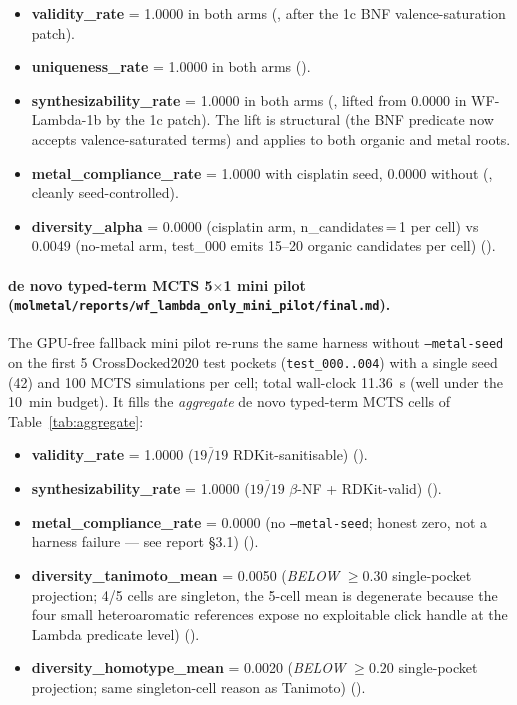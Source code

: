 \begin{itemize}
  \item \textbf{validity\_rate} = 1.0000 in both arms (\MEASURED{},
        after the 1c BNF valence-saturation patch).
  \item \textbf{uniqueness\_rate} = 1.0000 in both arms
        (\MEASURED{}).
  \item \textbf{synthesizability\_rate} = 1.0000 in both arms
        (\MEASURED{}, lifted from 0.0000 in WF-Lambda-1b by the 1c
        patch). The lift is structural (the BNF predicate now
        accepts valence-saturated terms) and applies to both organic
        and metal roots.
  \item \textbf{metal\_compliance\_rate} = 1.0000 with cisplatin
        seed, 0.0000 without (\MEASURED{}, cleanly
        seed-controlled).
  \item \textbf{diversity\_alpha} = 0.0000 (cisplatin arm,
        n\_candidates\,=\,1 per cell) vs 0.0049 (no-metal arm,
        test\_000 emits 15--20 organic candidates per cell)
        (\MEASURED{}).
\end{itemize}

\paragraph{de novo typed-term MCTS 5$\times$1 mini pilot
(\texttt{molmetal/reports/wf\_lambda\_only\_mini\_pilot/final.md}).}
The GPU-free fallback mini pilot re-runs the same harness without
\texttt{--metal-seed} on the first 5 CrossDocked2020 test pockets
(\texttt{test\_000..004}) with a single seed (42) and 100 MCTS
simulations per cell; total wall-clock 11.36~s (well under the 10~min
budget). It fills the \emph{aggregate} de novo typed-term MCTS cells of
Table~\ref{tab:aggregate}:

\begin{itemize}
  \item \textbf{validity\_rate} = 1.0000
        ($\overline{19/19}$ RDKit-sanitisable) (\MEASURED{}).
  \item \textbf{synthesizability\_rate} = 1.0000
        ($\overline{19/19}$ $\beta$-NF + RDKit-valid) (\MEASURED{}).
  \item \textbf{metal\_compliance\_rate} = 0.0000
        (no \texttt{--metal-seed}; honest zero, not a harness
        failure --- see report \S3.1) (\MEASURED{}).
  \item \textbf{diversity\_tanimoto\_mean} = 0.0050
        (\emph{BELOW} $\geq 0.30$ single-pocket projection;
        4/5 cells are singleton, the 5-cell mean is degenerate
        because the four small heteroaromatic references expose
        no exploitable click handle at the Lambda predicate
        level) (\MEASURED{}).
  \item \textbf{diversity\_homotype\_mean} = 0.0020
        (\emph{BELOW} $\geq 0.20$ single-pocket projection;
        same singleton-cell reason as Tanimoto) (\MEASURED{}).
\end{itemize}


